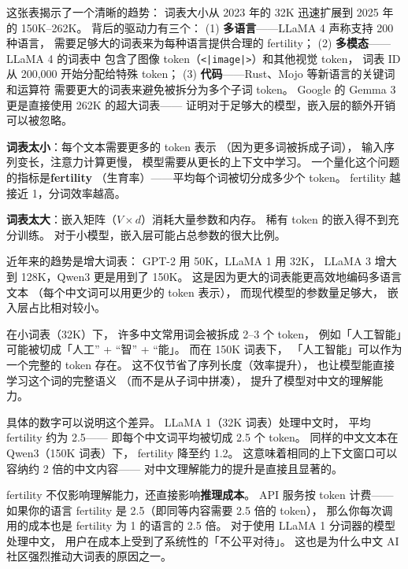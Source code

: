 \begin{whybox}[从 32K 到 262K：词表大小演进的逻辑]
这张表揭示了一个清晰的趋势：
词表大小从 2023 年的 32K 迅速扩展到 2025 年的 150K--262K。
背后的驱动力有三个：
(1) \textbf{多语言}——LLaMA 4 声称支持 200 种语言，
需要足够大的词表来为每种语言提供合理的 fertility；
(2) \textbf{多模态}——LLaMA 4 的词表中
包含了图像 token（\texttt{<|image|>}）和其他视觉 token，
词表 ID 从 200,000 开始分配给特殊 token；
(3) \textbf{代码}——Rust、Mojo 等新语言的关键词和运算符
需要更大的词表来避免被拆分为多个子词 token。
Google 的 Gemma 3 更是直接使用 262K 的超大词表——
证明对于足够大的模型，嵌入层的额外开销可以被忽略。
\end{whybox}

\textbf{词表太小}：每个文本需要更多的 token 表示
（因为更多词被拆成子词），
输入序列变长，注意力计算更慢，
模型需要从更长的上下文中学习。
一个量化这个问题的指标是\textbf{fertility}
（生育率）——平均每个词被切分成多少个 token。
fertility 越接近 1，分词效率越高。

\textbf{词表太大}：嵌入矩阵（$V \times d$）消耗大量参数和内存。
稀有 token 的嵌入得不到充分训练。
对于小模型，嵌入层可能占总参数的很大比例。

近年来的趋势是增大词表：
GPT-2 用 50K，LLaMA 1 用 32K，
LLaMA 3 增大到 128K，Qwen3 更是用到了 150K。
这是因为更大的词表能更高效地编码多语言文本
（每个中文词可以用更少的 token 表示），
而现代模型的参数量足够大，
嵌入层占比相对较小。

\begin{whybox}[为什么大词表能帮助中文？]
在小词表（32K）下，
许多中文常用词会被拆成 2--3 个 token，
例如「人工智能」可能被切成「人工'' + ``智'' + ``能」。
而在 150K 词表下，
「人工智能」可以作为一个完整的 token 存在。
这不仅节省了序列长度（效率提升），
也让模型能直接学习这个词的完整语义
（而不是从子词中拼凑），
提升了模型对中文的理解能力。

具体的数字可以说明这个差异。
LLaMA 1（32K 词表）处理中文时，
平均 fertility 约为 2.5——
即每个中文词平均被切成 2.5 个 token。
同样的中文文本在 Qwen3（150K 词表）下，
fertility 降至约 1.2。
这意味着相同的上下文窗口可以容纳约 2 倍的中文内容——
对中文理解能力的提升是直接且显著的。
\end{whybox}

\begin{warnbox}
fertility 不仅影响理解能力，还直接影响\textbf{推理成本}。
API 服务按 token 计费——
如果你的语言 fertility 是 2.5（即同等内容需要 2.5 倍的 token），
那么你每次调用的成本也是 fertility 为 1 的语言的 2.5 倍。
对于使用 LLaMA 1 分词器的模型处理中文，
用户在成本上受到了系统性的「不公平对待」。
这也是为什么中文 AI 社区强烈推动大词表的原因之一。
\end{warnbox}

